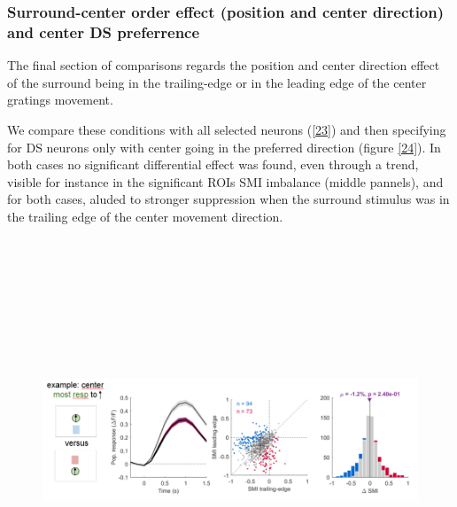 \subsubsection{Surround-center order effect (position and center direction) and center DS preferrence}

The final section of comparisons regards the position and center direction effect of the surround being in the trailing-edge or in the leading edge of the center gratings movement.

We compare these conditions with all selected neurons (\ref{23}) and then specifying for DS neurons only with center going in the preferred direction (figure \ref{24}). In both cases no significant differential effect was found, even through a trend, visible for instance in the significant ROIs SMI imbalance (middle pannels), and for both cases, aluded to stronger suppression when the surround stimulus was in the trailing edge of the center movement direction.

\begin{figure}[H] \centering \includegraphics[width=12cm,height=12cm,keepaspectratio]{Figures/7.Results/finalPopulation/sel/diagrams/23.png} 
\end{figure}\label{23}

